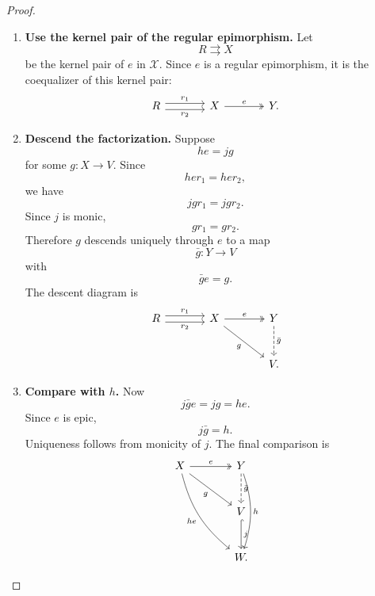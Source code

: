 \begin{proof}
    \leavevmode
    \begin{enumerate}
        \item \textbf{Use the kernel pair of the regular epimorphism.}
        Let
        \[
            R\rightrightarrows X
        \]
        be the kernel pair of \(e\) in \(\mathcal X\). Since \(e\) is a
        regular epimorphism, it is the coequalizer of this kernel pair:
        \[
        \begin{tikzcd}[column sep=large, row sep=large]
            R
                \arrow[r, shift left=0.65ex, "r_1"]
                \arrow[r, shift right=0.65ex, "r_2"']
            &
            X
                \arrow[r, two heads, "e"]
            &
            Y .
        \end{tikzcd}
        \]

        \item \textbf{Descend the factorization.}
        Suppose
        \[
            he=jg
        \]
        for some \(g:X\to V\). Since
        \[
            he r_1=he r_2,
        \]
        we have
        \[
            jg r_1=jg r_2.
        \]
        Since \(j\) is monic,
        \[
            g r_1=g r_2.
        \]
        Therefore \(g\) descends uniquely through \(e\) to a map
        \[
            \bar g:Y\to V
        \]
        with
        \[
            \bar g e=g.
        \]
        The descent diagram is
        \[
        \begin{tikzcd}[column sep=large, row sep=large]
            R
                \arrow[r, shift left=0.65ex, "r_1"]
                \arrow[r, shift right=0.65ex, "r_2"']
            &
            X
                \arrow[r, two heads, "e"]
                \arrow[dr, "g"']
            &
            Y
                \arrow[d, dashed, "\bar g"]
            \\
            &&
            V .
        \end{tikzcd}
        \]

        \item \textbf{Compare with \(h\).}
        Now
        \[
            j\bar g e=jg=he.
        \]
        Since \(e\) is epic,
        \[
            j\bar g=h.
        \]
        Uniqueness follows from monicity of \(j\). The final comparison is
        \[
        \begin{tikzcd}[column sep=large, row sep=large]
            X
                \arrow[r, two heads, "e"]
                \arrow[dr, "g"']
                \arrow[ddr, "he"', bend right=18]
            &
            Y
                \arrow[d, dashed, "\bar g"]
                \arrow[dd, "h", bend left=18]
            \\
            &
            V
                \arrow[d, hook, "j"]
            \\
            &
            W .
        \end{tikzcd}
        \]
    \end{enumerate}
\end{proof}

